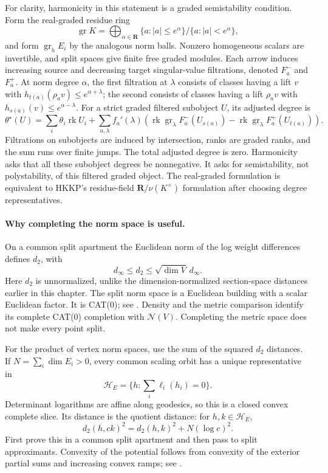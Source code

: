 For clarity, harmonicity in this statement is a graded semistability
condition. Form the real-graded residue ring
\[
 \operatorname{gr}K=
 \bigoplus_{\alpha\in\mathbf R}
 \{a:|a|\leq e^\alpha\}/\{a:|a|<e^\alpha\},
\]
and form $\operatorname{gr}_h E_i$ by the analogous norm balls.
Nonzero homogeneous scalars are invertible, and split spaces give finite
free graded modules. Each arrow induces increasing source and decreasing
target singular-value filtrations, denoted $F_a^-$ and $F_a^+$.
At norm degree $\alpha$, the first filtration at $\lambda$ consists of
classes having a lift $v$ with $h_{t(a)}(\rho_av)\leq e^{\alpha+\lambda}$;
the second consists of classes having a lift $\rho_av$ with
$h_{s(a)}(v)\leq e^{\alpha-\lambda}$.
For a strict graded filtered subobject $U$, its adjusted degree is
\[
 \theta^\star(U)=\sum_i\theta_i\operatorname{rk}U_i
 +\sum_{a,\lambda}f_a'(\lambda)
 \left(\operatorname{rk}\operatorname{gr}_\lambda F_a^-(U_{s(a)})
       -\operatorname{rk}\operatorname{gr}_\lambda F_a^+(U_{t(a)})\right).
\tag{50.90d}\label{eq:ch50-quiver-harmonic-degree}
\]
Filtrations on subobjects are induced by intersection, ranks are graded
ranks, and the sum runs over finite jumps. The total adjusted degree is
zero. Harmonicity asks that all these subobject degrees be nonnegative.
It asks for semistability, not polystability, of this filtered graded object.
The real-graded formulation is equivalent to HKKP's residue-field
$\mathbf R/\nu(K^\times)$ formulation after choosing degree representatives.

\paragraph{Why completing the norm space is useful.}
On a common split apartment the Euclidean norm of the log weight
differences defines $d_2$, with
\[
 d_\infty\leq d_2\leq\sqrt{\dim V}\,d_\infty.
\]
Here $d_2$ is unnormalized, unlike the dimension-normalized section-space
distances earlier in this chapter. The split norm space is a Euclidean
building with a scalar Euclidean factor. It is CAT(0); see
\cite[Proposition~2.10]{Parreau00AffineAuthor}.
Density and the metric comparison identify its complete CAT(0)
completion with $\mathcal N(V)$. Completing the metric space does not
make every point split.

For the product of vertex norm spaces, use the sum of the squared
$d_2$ distances. If $N=\sum_i\dim E_i>0$, every common scaling orbit
has a unique representative in
\[
 \mathcal H_E=\{h:\textstyle\sum_i\ell_i(h_i)=0\}.
\]
Determinant logarithms are affine along geodesics, so this is a closed
convex complete slice. Its distance is the quotient distance: for
$h,k\in\mathcal H_E$,
\[
 d_2(h,ck)^2=d_2(h,k)^2+N(\log c)^2.
\tag{50.90e}\label{eq:ch50-quiver-scaling-slice}
\]
First prove this in a common split apartment and then pass to split
approximants. Convexity of the potential follows from convexity of the
exterior partial sums and increasing convex ramps; see
\cite[Lemma~3.2]{BB26HarmonicQuiverV1}.

